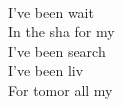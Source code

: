   \\
I've been wait \\
In the sha for my  \\
I've been search \\
I've been liv \\
For tomor all my  \\

